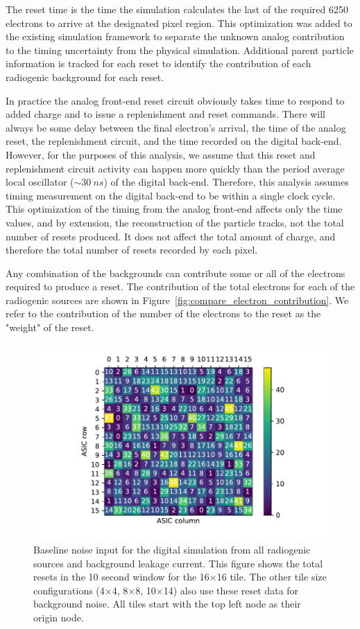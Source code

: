 The reset time is the time the simulation calculates the last of the required 6250 electrons to arrive at the designated pixel region.
This optimization was added to the existing simulation framework to separate the unknown analog contribution to the timing uncertainty from the physical simulation.
Additional parent particle information is tracked for each reset to identify the contribution of each radiogenic background for each reset.

In practice the analog front-end reset circuit obviously takes time to respond to added charge and to issue a replenishment and reset commands.
There will always be some delay between the final electron's arrival, the time of the analog reset, the replenishment circuit, and the time recorded on the digital back-end.
However, for the purposes of this analysis, we assume that this reset and replenishment circuit activity can happen more quickly than the period average local oscillator ($\sim 30~\unit{ns}$) of the digital back-end. 
Therefore, this analysis assumes timing measurement on the digital back-end to be within a single clock cycle.
This optimization of the timing from the analog front-end affects only the time values, and by extension, the reconstruction of the particle tracks, not the total number of resets produced.
It does not affect the total amount of charge, and therefore the total number of resets recorded by each pixel.

Any combination of the backgrounds can contribute some or all of the electrons required to produce a reset.
The contribution of the total electrons for each of the radiogenic sources are shown in Figure~\ref{fig:compare_electron_contribution}.
We refer to the contribution of the number of the electrons to the reset as the "weight" of the reset.

\begin{figure}[]
\centering
\includegraphics[width=\textwidth]{images/localHitsRadiogenic.pdf}
\caption{Baseline noise input for the digital simulation from all radiogenic sources and background leakage current. 
This figure shows the total resets in the 10 second window for the 16$\times$16 tile.
The other tile size configurations (4$\times$4, 8$\times$8, 10$\times$14) also use these reset data for background noise.
All tiles start with the top left node as their origin node.
}
\end{figure}~\label{fig:reference_input_noise}

